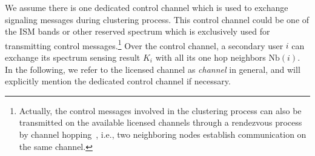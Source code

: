 \documentclass[10pt,journal,compsoc]{IEEEtran}
\theoremstyle{mytheoremstyle}
\theoremstyle{mytheoremstyle}
\theoremstyle{mytheoremstyle}
\begin{document}
We assume there is one dedicated control channel which is used to exchange signaling messages during clustering process.
This control channel could be one of the ISM bands or other reserved spectrum which is exclusively used for transmitting control messages.\footnote{Actually, the control messages involved in the clustering process can also be transmitted on the available licensed channels through a rendezvous process by channel hopping~\cite{channelHopping_Rendezvous_2014, Gu_distributed_rendezvous_2014}, i.e., two neighboring nodes establish communication on the same channel.}
Over the control channel, a secondary user $i$ can exchange its spectrum sensing result $K_i$ with all its one hop neighbors $\text{Nb}(i)$.
In the following, we refer to the licensed channel as \textit{channel} in general, and will explicitly mention the dedicated control channel if necessary. 
\end{document}
